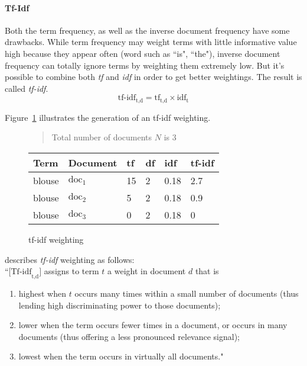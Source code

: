 \paragraph{Tf-Idf}
\label{sec:tfidf}
Both the term frequency, as well as the inverse document frequency have some drawbacks.
While term frequency may weight terms with little informative value high because they appear often (word such as ``is", ``the"), inverse document frequency can totally ignore terms by weighting them extremely low.
But it's possible to combine both \textit{tf} and \textit{idf} in order to get better weightings.
The result is called \textit{tf-idf}.\citep[p.~118-119]{manning:2009}
\begin{equation}
    \text{tf-idf}_{\text{t,d}} = \text{tf}_\text{t,d} \times \text{idf}_\text{t}
    \label{eq:tf-idf-forumula}
\end{equation}

\noindent
Figure~\ref{fig:tfidfweighting} illustrates the generation of an tf-idf weighting.
\begin{figure}[h]

    \begin{quote}
        Total number of documents $N$ is 3\\
    \end{quote}

    \center
    \begin{tabular}{ l l | l l l l }
        \rowcolor{\dustRowHead}
        Term                    & Document          & tf    & df & idf   & tf-idf\\\hline
        blouse                  & $\text{doc}_1$    & 15    &  2 & 0.18  & 2.7\\
        blouse                  & $\text{doc}_2$    & 5     &  2 & 0.18  & 0.9\\
        blouse                  & $\text{doc}_3$    & 0     &  2 & 0.18  & 0\\
    \end{tabular}
    \caption{tf-idf weighting}
    \label{fig:tfidfweighting}
\end{figure}

\noindent
\citeauthor{manning:2009} describes \textit{tf-idf} weighting as follows:\\
``$\text{[Tf-idf}_{\text{t,d}}\text{]}$ assigns to term $t$ a weight in document $d$ that is
\begin{enumerate}
    \item highest when $t$ occurs many times within a small number of documents
    (thus lending high discriminating power to those documents);
    \item lower when the term occurs fewer times in a document, or occurs in many
    documents (thus offering a less pronounced relevance signal);
    \item lowest when the term occurs in virtually all documents."
\end{enumerate}
\citep[p.~119]{manning:2009}

